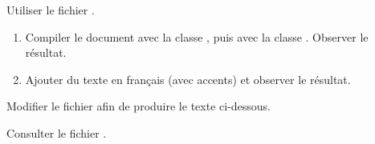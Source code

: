 \begin{exercice}[nosol]
  Utiliser le fichier .
  \begin{enumerate}
  \item Compiler le document avec la classe , puis avec
    la classe . Observer le résultat.
  \item Ajouter du texte en français (avec accents) et observer le
    résultat.
  \end{enumerate}
\end{exercice}

\begin{exercice}
  \label{ex:base:commandes}
  Modifier le fichier  afin
  de produire le texte ci-dessous.
  \begin{center}
  \end{center}
  \begin{sol}
    Consulter le fichier .
  \end{sol}
\end{exercice}

